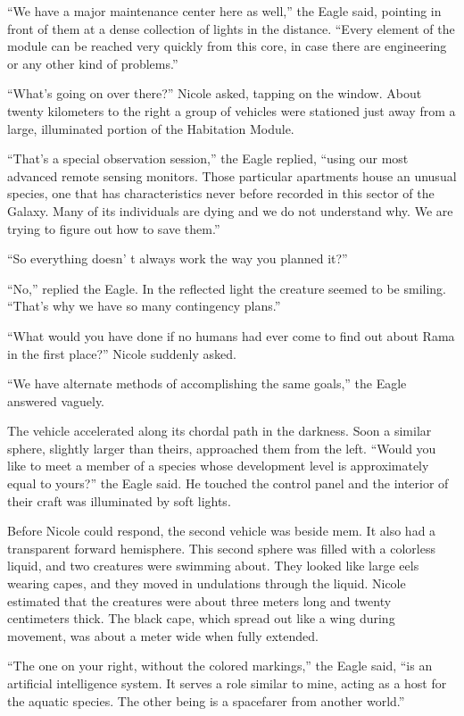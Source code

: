 \documentclass[]{article}
\begin{document}
{“We have a major maintenance center here as well,” the Eagle said, pointing in front of them at a dense collection of lights in the distance. “Every element of the module can be reached very quickly from this core, in case there are engineering or any other kind of problems.”

“What’s going on over there?” Nicole asked, tapping on the window. About twenty kilometers to the right a group of vehicles were stationed just away from a large, illuminated portion of the Habitation Module.

“That’s a special observation session,” the Eagle replied, “using our most advanced remote sensing monitors. Those particular apartments house an unusual species, one that has characteristics never before recorded in this sector of the Galaxy. Many of its individuals are dying and we do not understand why. We are trying to figure out how to save them.”

“So everything doesn’ t always work the way you planned it?”

“No,” replied the Eagle. In the reflected light the creature seemed to be smiling. “That’s why we have so many contingency plans.”

“What would you have done if no humans had ever come to find out about Rama in the first place?” Nicole suddenly asked.

“We have alternate methods of accomplishing the same goals,” the Eagle answered vaguely.

The vehicle accelerated along its chordal path in the darkness. Soon a similar sphere, slightly larger than theirs, approached them from the left. “Would you like to meet a member of a species whose development level is approximately equal to yours?” the Eagle said. He touched the control panel and the interior of their craft was illuminated by soft lights.

Before Nicole could respond, the second vehicle was beside mem. It also had a transparent forward hemisphere. This second sphere was filled with a colorless liquid, and two creatures were swimming about. They looked like large eels wearing capes, and they moved in undulations through the liquid. Nicole estimated that the creatures were about three meters long and twenty centimeters thick. The black cape, which spread out like a wing during movement, was about a meter wide when fully extended.

“The one on your right, without the colored markings,” the Eagle said, “is an artificial intelligence system. It serves a role similar to mine, acting as a host for the aquatic species. The other being is a spacefarer from another world.”

}
\end{document}
